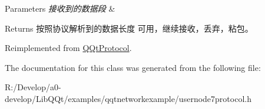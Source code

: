 \begin{DoxyParams}{Parameters}
{\em 接收到的数据段} & \\
\hline
\end{DoxyParams}
\begin{DoxyReturn}{Returns}
按照协议解析到的数据长度 可用，继续接收，丢弃，粘包。 
\end{DoxyReturn}


Reimplemented from \mbox{\hyperlink{class_q_qt_protocol_a00fd0c1ac23379ed3b9b25da9a34f39b}{Q\+Qt\+Protocol}}.



The documentation for this class was generated from the following file\+:\begin{DoxyCompactItemize}
\item 
R\+:/\+Develop/a0-\/develop/\+Lib\+Q\+Qt/examples/qqtnetworkexample/usernode7protocol.\+h\end{DoxyCompactItemize}
